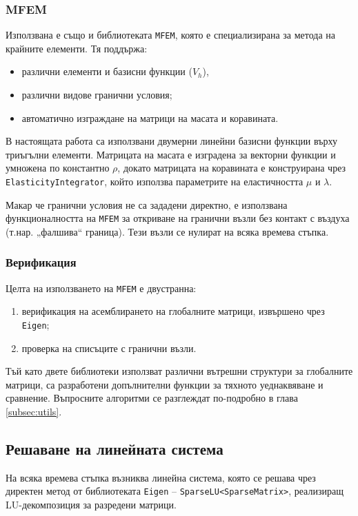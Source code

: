 \documentclass{report}
\begin{document}
	\subsubsection*{MFEM}
	Използвана е също и библиотеката \texttt{MFEM}, която е специализирана за метода на крайните елементи. Тя поддържа:
	\begin{itemize}
		\item различни елементи и базисни функции ($V_h$),
		\item различни видове гранични условия;
		\item автоматично изграждане на матрици на масата и коравината.
	\end{itemize}
	
	В настоящата работа са използвани двумерни линейни базисни функции върху триъгълни елементи. Матрицата на масата е изградена за векторни функции и умножена по константно $\rho$, докато матрицата на коравината е конструирана чрез \texttt{ElasticityIntegrator}, който използва параметрите на еластичността $\mu$ и $\lambda$.
	
	Макар че гранични условия не са зададени директно, е използвана функционалността на \texttt{MFEM} за откриване на гранични възли без контакт с въздуха (т.нар. „фалшива“ граница). Тези възли се нулират на всяка времева стъпка.
	
	\subsubsection*{Верификация}
	Целта на използването на \texttt{MFEM} е двустранна:
	\begin{enumerate}
		\item верификация на асемблирането на глобалните матрици, извършено чрез \texttt{Eigen};
		\item проверка на списъците с гранични възли.
	\end{enumerate}
	Тъй като двете библиотеки използват различни вътрешни структури за глобалните матрици, са разработени допълнителни функции за тяхното уеднаквяване и сравнение. Въпросните алгоритми се разглеждат по-подробно в глава \ref{subsec:utils}.
	
	\subsection{Решаване на линейната система}
	
	На всяка времева стъпка възниква линейна система, която се решава чрез директен метод от библиотеката \texttt{Eigen} – \texttt{SparseLU<SparseMatrix>}, реализиращ LU-декомпозиция за разредени матрици.
	
\end{document}
